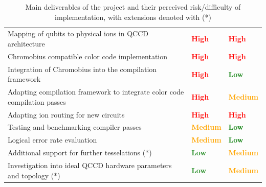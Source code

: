 \begin{table}[!h]
\centering
\renewcommand{\arraystretch}{1.2}
\begin{tabular}{|>{\raggedright\arraybackslash}p{9cm}|>{\raggedright\arraybackslash}p{2cm}|>{\raggedright\arraybackslash}p{2cm}|}
\hline
\multicolumn{1}{|c|}{\textbf{Main Deliverables}} & 
\multicolumn{1}{c|}{\textbf{Priority}} & 
\multicolumn{1}{c|}{\textbf{Risk}} \\
\hline

Mapping of qubits to physical ions in QCCD architecture
& \textcolor{red}{\textbf{High}} 
& \textcolor{red}{\textbf{High}} \\
\hline

Chromobius compatible color code implementation
& \textcolor{red}{\textbf{High}} 
& \textcolor{red}{\textbf{High}} \\
\hline

Integration of Chromobius into the compilation framework
& \textcolor{red}{\textbf{High}} 
& \textcolor{ForestGreen}{\textbf{Low}} \\
\hline

Adapting compilation framework to integrate color code compilation passes
& \textcolor{red}{\textbf{High}} 
& \textcolor{orange}{\textbf{Medium}} \\
\hline

Adapting ion routing for new circuits
& \textcolor{red}{\textbf{High}}
& \textcolor{red}{\textbf{High}} \\
\hline

Testing and benchmarking compiler passes
& \textcolor{orange}{\textbf{Medium}}
& \textcolor{ForestGreen}{\textbf{Low}} \\
\hline

Logical error rate evaluation
& \textcolor{orange}{\textbf{Medium}}
& \textcolor{ForestGreen}{\textbf{Low}} \\
\hline

Additional support for further tesselations (*)
& \textcolor{ForestGreen}{\textbf{Low}}
& \textcolor{orange}{\textbf{Medium}} \\
\hline

Investigation into ideal QCCD hardware parameters and topology (*)
& \textcolor{ForestGreen}{\textbf{Low}} 
& \textcolor{orange}{\textbf{Medium}} \\
\hline

\end{tabular}
\caption{Main deliverables of the project and their perceived risk/difficulty of implementation, with extensions denoted with (*)}
\label{tab:deliverables}
\end{table}


